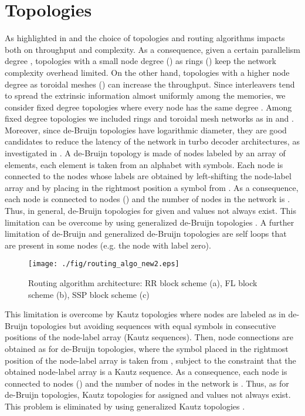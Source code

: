 \documentclass[10pt,twocolumn,journal]{IEEEtran}
\begin{document}
\section{Topologies}
\label{sec:topologies}

As highlighted in \cite{wehn_iscas05} and \cite{moussa_iscas08} the choice of topologies and routing algorithms 
impacts both on throughput and complexity. As a consequence, given a certain parallelism degree , topologies 
with a small node degree () as rings () keep the network complexity overhead limited. 
On the other hand, topologies with a higher node degree 
as toroidal meshes () can increase the throughput. Since interleavers tend to spread the extrinsic information 
almost uniformly among the  memories, we consider fixed degree topologies where every node has the same degree . 
Among fixed degree topologies we included rings and toroidal mesh networks as in \cite{wehn_icecs02} and 
\cite{wehn_iscas05}. 
Moreover, since de-Bruijn topologies have logarithmic diameter, they are good candidates to 
reduce the latency of the network in turbo decoder architectures, as investigated in \cite{moussa_iscas08}.
A de-Bruijn topology is made of nodes labeled by an array of  elements, each element is taken from an 
alphabet  with  symbols. 
Each node is connected to the nodes whose labels are obtained by left-shifting the 
node-label array and by placing in the rightmost position a symbol from . As a consequence, each node 
is connected to  nodes () and the number of nodes in the network is . Thus, in general, de-Bruijn 
topologies for given  and  values not always exist. This limitation can be overcome by using generalized 
de-Bruijn topologies \cite{imase_TC81}. 
A further limitation of de-Bruijn and generalized de-Bruijn topologies are 
self loops that are present in some nodes (e.g. the node with label zero). 
\begin{figure*}[t!]
  \centering
  \texttt{[image: ./fig/routing\_algo\_new2.eps]}
\caption{Routing algorithm architecture: RR block scheme (a), FL block scheme (b), SSP block scheme (c)}
\label{fig:routing_algo}
\end{figure*}

This limitation is overcome by Kautz topologies where nodes are labeled as in de-Bruijn topologies but avoiding 
sequences with equal symbols in consecutive positions of the node-label array 
(Kautz sequences). 
Then, node connections are obtained as for de-Bruijn topologies, where the symbol placed in the rightmost position of 
the node-label array is taken from , subject to the constraint that the obtained node-label array 
is a Kautz sequence. As a consequence, each node is connected to  nodes () and the number of
nodes in the network is . Thus, as for de-Bruijn topologies, Kautz topologies for assigned 
 and  values not always exist. This problem is eliminated by using generalized Kautz topologies 
\cite{imase_TC83}.
\end{document}
